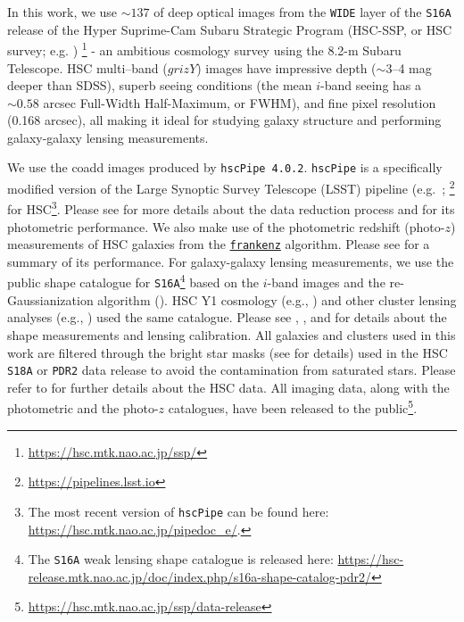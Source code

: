 \documentclass[fleqn,usenatbib,useAMS]{mnras}
\begin{document}
\begin{CJK*}{UTF8}{gbsn}
    In this work, we use $\sim 137$ \sqdeg{} of deep optical images from the \texttt{WIDE}
    layer of the \texttt{S16A} release of the Hyper Suprime-Cam Subaru Strategic Program
    (HSC-SSP, or HSC survey; e.g. \citealt{HSC-SSP, HSC-DR1, HSC-DR2})
    \footnote{\url{https://hsc.mtk.nao.ac.jp/ssp/}} - an ambitious cosmology survey using the
    8.2-m Subaru Telescope.
    HSC multi--band ($grizY$) images have impressive depth ($\sim$3--4 mag deeper than
    SDSS), superb seeing conditions (the mean $i$-band seeing has a $\sim 0.58$ arcsec Full-Width
    Half-Maximum, or FWHM), and fine pixel resolution (0.168 arcsec), all making it ideal
    for studying galaxy structure and performing galaxy-galaxy lensing measurements.

    We use the coadd images produced by \texttt{hscPipe 4.0.2}.
    \texttt{hscPipe} is a specifically modified version of the Large Synoptic Survey
    Telescope (LSST) pipeline (e.g.\ \citealt{Juric2015}; 
    \citealt{Axelrod2010}\footnote{{\url{https://pipelines.lsst.io}}} for HSC\footnote{
        The most recent version of \texttt{hscPipe} can be found here:
        \url{https://hsc.mtk.nao.ac.jp/pipedoc_e/}.
    }.
    Please see \citet{HSC-PIPE} for more details about the data reduction process and
    \citet{SynPipe} for its photometric performance.
    We also make use of the photometric redshift (photo-$z$) measurements of HSC galaxies from the
    \href{https://github.com/joshspeagle/frankenz}{\texttt{frankenz}} \citep{Speagle2019} algorithm.
    Please see \citet{HSC-PHOTOZ} for a summary of its performance.
    For galaxy-galaxy lensing measurements, we use the public shape catalogue for 
    \texttt{S16A}\footnote{The \texttt{S16A} weak lensing shape catalogue is released here:
    \url{https://hsc-release.mtk.nao.ac.jp/doc/index.php/s16a-shape-catalog-pdr2/}}
    based on the $i$-band images and the re-Gaussianization algorithm (\citealt{HirataSeljak2003}).
    HSC Y1 cosmology (e.g., \citealt{Hikage2019, Hamana2020}) and other cluster lensing analyses
    (e.g., \citealt{Umetsu2020}) used the same catalogue.
    Please see \citet{HSC-PIPE}, \citet{HSC-WLCAT}, and \citet{HSC-WLCALIB} for details about the
    shape measurements and lensing calibration.
    All galaxies and clusters used in this work are filtered through the bright star masks (see
    \citealt{HSC-STAR} for details) used in the HSC \texttt{S18A} or \texttt{PDR2} data release to
    avoid the contamination from saturated stars.
    Please refer to \citet{Huang2018b, Huang2018c, Huang2020} for further details about the
    HSC data. 
    All imaging data, along with the photometric and the photo-$z$ catalogues, have been released to
    the public\footnote{\url{https://hsc.mtk.nao.ac.jp/ssp/data-release}}.
    

\end{CJK*}
\end{document}
